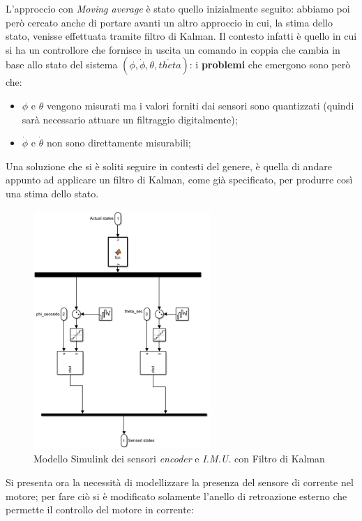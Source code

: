 L'approccio con \textit{Moving average} è stato quello inizialmente seguito: abbiamo poi però cercato anche di portare avanti un altro approccio in cui, la stima dello stato, venisse effettuata tramite filtro di Kalman.
Il contesto infatti è quello in cui si ha un controllore che fornisce in uscita un comando in coppia che cambia in base allo stato del sistema $(\phi, \dot{\phi}, \theta, \dot{theta})$: i \textbf{problemi} che emergono sono però che:
\begin{itemize}
	\item $\phi$ e $\theta$ vengono misurati ma i valori forniti dai sensori sono quantizzati (quindi sarà necessario attuare un filtraggio digitalmente);
	\item $\dot{\phi}$ e $\dot{\theta}$ non sono direttamente misurabili;
\end{itemize}

Una soluzione che si è soliti seguire in contesti del genere, è quella di andare appunto ad applicare un filtro di Kalman, come già specificato, per produrre così una stima dello stato.

\begin{figure}[H]
	\centering   	
	\includegraphics[width=0.6\textwidth]{Immagini/sensor_block_kalman.png}
	\caption{Modello Simulink dei sensori \textit{encoder} e \textit{I.M.U.} con Filtro di Kalman}
	\label{fig:sensor_block_kalman}
\end{figure}


Si presenta ora la necessità di modellizzare la presenza del sensore di corrente nel motore; per fare ciò si è modificato solamente l'anello di retroazione esterno che permette il controllo del motore in corrente:

